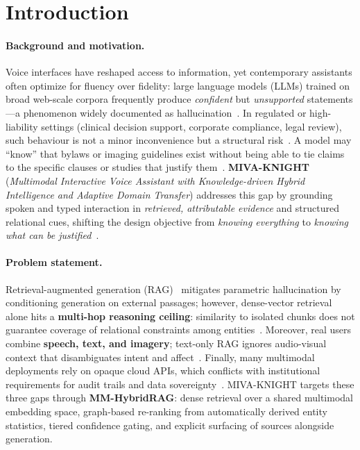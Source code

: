 
\section{Introduction}

\begingroup
{}
\setlength{\parskip}{0.35em}
\small

\paragraph{Background and motivation.}
Voice interfaces have reshaped access to information, yet contemporary assistants often optimize for fluency over fidelity: large language models (LLMs) trained on broad web-scale corpora frequently produce \emph{confident} but \emph{unsupported} statements---a phenomenon widely documented as hallucination~\cite{ji2023survey,zhang2023sirens,lewis2020rag}. In regulated or high-liability settings (clinical decision support, corporate compliance, legal review), such behaviour is not a minor inconvenience but a structural risk~\cite{pan2024unifying}. A model may ``know'' that bylaws or imaging guidelines exist without being able to tie claims to the specific clauses or studies that justify them~\cite{johnson2019mimic}. \textbf{MIVA-KNIGHT} (\emph{Multimodal Interactive Voice Assistant with Knowledge-driven Hybrid Intelligence and Adaptive Domain Transfer}) addresses this gap by grounding spoken and typed interaction in \emph{retrieved, attributable evidence} and structured relational cues, shifting the design objective from \emph{knowing everything} to \emph{knowing what can be justified}~\cite{sarmah2024hybridrag}.

\paragraph{Problem statement.}
Retrieval-augmented generation (RAG)~\cite{lewis2020rag} mitigates parametric hallucination by conditioning generation on external passages; however, dense-vector retrieval alone hits a \textbf{multi-hop reasoning ceiling}: similarity to isolated chunks does not guarantee coverage of relational constraints among entities~\cite{sarmah2024hybridrag,yang2018hotpotqa}. Moreover, real users combine \textbf{speech, text, and imagery}; text-only RAG ignores audio-visual context that disambiguates intent and affect~\cite{kadam2022multimodal}. Finally, many multimodal deployments rely on opaque cloud APIs, which conflicts with institutional requirements for audit trails and data sovereignty~\cite{pan2024unifying}. MIVA-KNIGHT targets these three gaps through \textbf{MM-HybridRAG}: dense retrieval over a shared multimodal embedding space, graph-based re-ranking from automatically derived entity statistics, tiered confidence gating, and explicit surfacing of sources alongside generation.


